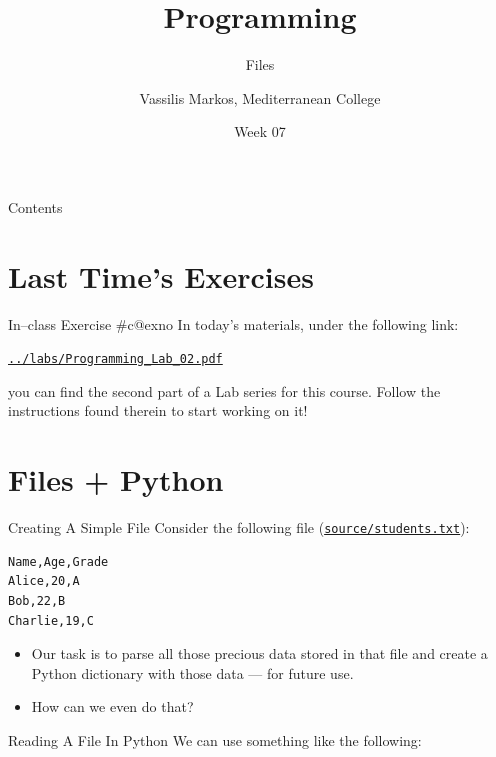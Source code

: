 \documentclass[aspectratio=169, 12pt, xcolor=table]{beamer}
\title{Programming}
\subtitle{Files}
\date{Week 07}
\author{Vassilis Markos, Mediterranean College}
\makeatletter
\newcommand{\ohref}[1]{\href{#1}{\texttt{#1}}}
\newcommand{\arabicthree}[1]{\expandafter\@arabicthree\csname c@#1\endcsname}
\newcommand{\@arabicthree}[1]{\ifnum #1<100 0\fi\ifnum #1<10 0\fi\number#1}
\newcounter{exno}
\newcommand{\exno}{\stepcounter{exno}In--class Exercise \#\arabicthree{exno}}
\makeatother
\begin{document}
	\begin{frame}
		\titlepage
	\end{frame}

	\begin{frame}{Contents}
		\tableofcontents
	\end{frame}

	\section{Last Time's Exercises}\label{sec:last-time-s-exercises}
	
	\sectionframe
	
	\setcounter{exno}{0}
	
	\begin{frame}{\exno}		
		In today's materials, under the following link:
		\begin{center}
			\ohref{../labs/Programming\_Lab\_02.pdf}
		\end{center}
		you can find the second part of a Lab series for this course. Follow the instructions found therein to start working on it!
	\end{frame}

	\section{Files + Python}\label{sec:files---python}
	
	\sectionframe
	
	
	\begin{frame}[fragile]{Creating A Simple File}
		Consider the following file (\ohref{source/students.txt}):
		\begin{lstlisting}
Name,Age,Grade
Alice,20,A
Bob,22,B
Charlie,19,C
\end{lstlisting}
		\begin{itemize}
			\item Our task is to parse all those precious data stored in that file and create a Python dictionary with those data --- for future use.
			\item How can we even do that?
		\end{itemize}
	\end{frame}

	\begin{frame}{Reading A File In Python}
		We can use something like the following:
		
	\end{frame}
\end{document}
